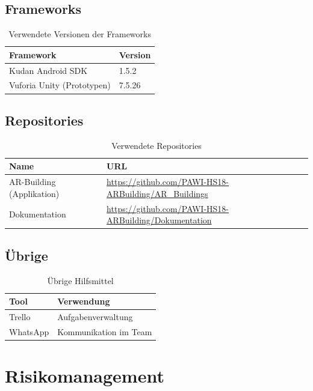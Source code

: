 \documentclass[a4paper]{scrreprt}
\begin{document}
\subsection{Frameworks}
\begin{table}[h!]
	\begin{tabular}{p{} p{}}
		\hline
		\textbf{Framework} & \textbf{Version} \\
		\hline
		Kudan Android SDK & 1.5.2 \\
		\hline
		Vuforia Unity (Prototypen) & 7.5.26 \\
		\hline
	\end{tabular}
	\caption{Verwendete Versionen der Frameworks}
\end{table}



\subsection{Repositories}
\begin{table}[h!]
	\begin{tabular}{p{} p{}}
		\hline
		\textbf{Name} & \textbf{URL} \\
		\hline
		AR-Building (Applikation) & \url{https://github.com/PAWI-HS18-ARBuilding/AR_Buildings} \\
		\hline
		Dokumentation & \url{https://github.com/PAWI-HS18-ARBuilding/Dokumentation} \\
		\hline
	\end{tabular}
	\caption{Verwendete Repositories}
\end{table}

\subsection{Übrige}
\begin{table}[h!]
	\begin{tabular}{p{} p{}}
		\hline
		\textbf{Tool} & \textbf{Verwendung} \\
		\hline
		Trello & Aufgabenverwaltung \\
		\hline
		WhatsApp & Kommunikation im Team \\
		\hline
	\end{tabular}
	\caption{Übrige Hilfsmittel}
\end{table}

\section{Risikomanagement}
\end{document}

